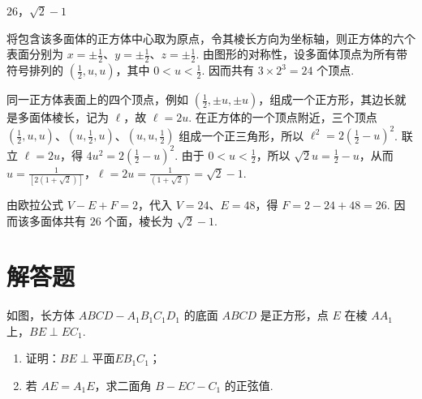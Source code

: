 \begin{answer}
\(26\)，\(\sqrt{2}-1\)
\end{answer}

\begin{solution}
将包含该多面体的正方体中心取为原点，令其棱长方向为坐标轴，则正方体的六个表面分别为 \(x=\pm\frac{1}{2}\)、\(y=\pm\frac{1}{2}\)、\(z=\pm\frac{1}{2}\). 由图形的对称性，设多面体顶点为所有带符号排列的 \((\frac{1}{2},u,u)\)，其中 \(0<u<\frac{1}{2}\). 因而共有 \(3\times2^3=24\) 个顶点.

同一正方体表面上的四个顶点，例如 \((\frac{1}{2},\pm u,\pm u)\)，组成一个正方形，其边长就是多面体棱长，记为 \(\ell\)，故 \(\ell=2u\). 在正方体的一个顶点附近，三个顶点 \((\frac{1}{2},u,u)\)、\((u,\frac{1}{2},u)\)、\((u,u,\frac{1}{2})\) 组成一个正三角形，所以 \(\ell^2=2(\frac{1}{2}-u)^2\). 联立 \(\ell=2u\)，得 \(4u^2=2(\frac{1}{2}-u)^2\). 由于 \(0<u<\frac{1}{2}\)，所以 \(\sqrt2u=\frac{1}{2}-u\)，从而 \(u=\frac{1}{[2(1+\sqrt2)]}\)，\(\ell=2u=\frac{1}{(1+\sqrt2)}=\sqrt2-1\).

由欧拉公式 \(V-E+F=2\)，代入 \(V=24\)、\(E=48\)，得 \(F=2-24+48=26\). 因而该多面体共有 \(26\) 个面，棱长为 \(\sqrt2-1\).
\end{solution}

\section{解答题}

\begin{problem}
如图，长方体 \(ABCD-A_1B_1C_1D_1\) 的底面 \(ABCD\) 是正方形，点 \(E\) 在棱 \(AA_1\) 上，\(BE\perp EC_1\).

\begin{enumerate}
\item 证明：\(BE\perp \text{平面} EB_1C_1\)；
\item 若 \(AE=A_1E\)，求二面角 \(B-EC-C_1\) 的正弦值.
\end{enumerate}

\end{problem}

